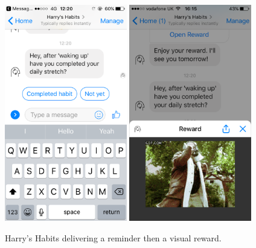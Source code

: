 \begin{figure}[H]
  \centering
  \includegraphics[width=2.1in]{resources/figures/reminder.png}
  \hspace{10px}
  \includegraphics[width=2.1in]{resources/figures/reward-visual.png}
  \caption{Harry's Habits delivering a reminder then a visual reward.}
  \label{fig:setup_media_1}
\end{figure}

